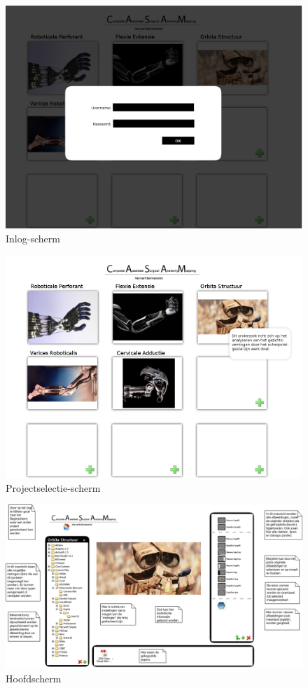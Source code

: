 \begin{figure}[htp]
\begin{center}
	\includegraphics[scale=0.65]{inlog}
\caption{Inlog-scherm}
\label{default}
\end{center}
\end{figure}

\begin{figure}[htp]
\begin{center}
	\includegraphics[scale=0.65]{projectoverzicht}
\caption{Projectselectie-scherm}
\label{default}
\end{center}
\end{figure}

\begin{figure}[htp]
\begin{center}
	\includegraphics[scale=0.65]{main_uitleg}
\caption{Hoofdscherm}
\label{default}
\end{center}
\end{figure}

